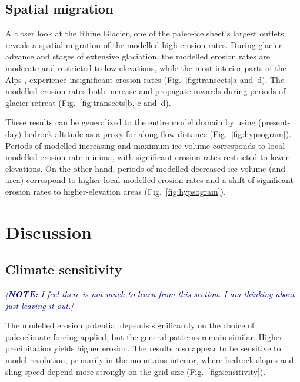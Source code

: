 \documentclass[utf8]{article}
\newcommand{\note}[1]{\textcolor{darkblue}{\emph{[\textbf{NOTE:} #1]}}}
\begin{document}
\subsection{Spatial migration}

    A closer look at the Rhine Glacier, one of the paleo-ice sheet's largest
    outlets, reveals a spatial migration of the modelled high erosion rates.
    During glacier advance and stages of extensive glaciation, the modelled
    erosion rates are moderate and restricted to low elevations, while the
    most interior parts of the Alps \citep[modelled to be
    largely-cold-based][Fig.~6c]{Seguinot.etal.2018}, experience insignificant
    erosion rates (Fig.~\ref{fig:transects}a and~d). The modelled erosion
    rates both increase and propagate inwards during periods of glacier
    retreat (Fig.~\ref{fig:transects}b, c and~d).

    These results can be generalized to the entire model domain by using
    (present-day) bedrock altitude as a proxy for along-flow distance
    (Fig.~\ref{fig:hypsogram}). Periods of modelled increasing and maximum ice
    volume corresponds to local modelled erosion rate minima, with significant
    erosion rates restricted to lower elevations. On the other hand, periods of
    modelled decreased ice volume (and area) correspond to higher local
    modelled erosion rates and a shift of significant erosion rates to
    higher-elevation areas (Fig.~\ref{fig:hypsogram}).


\section{Discussion}

\subsection{Climate sensitivity}
\label{sec:sensitivity}

    \note{I feel there is not much to learn from this section. I am thinking
          about just leaving it out.}

    The modelled erosion potential depends significantly on the choice of
    paleoclimate forcing applied, but the general patterns remain similar.
    Higher precipitation yields higher erosion. The results also appear to be
    sensitive to model resolution, primarily in the mountains interior, where
    bedrock slopes and sling speed depend more strongly on the grid size
    (Fig.~\ref{fig:sensitivity}).
\end{document}
